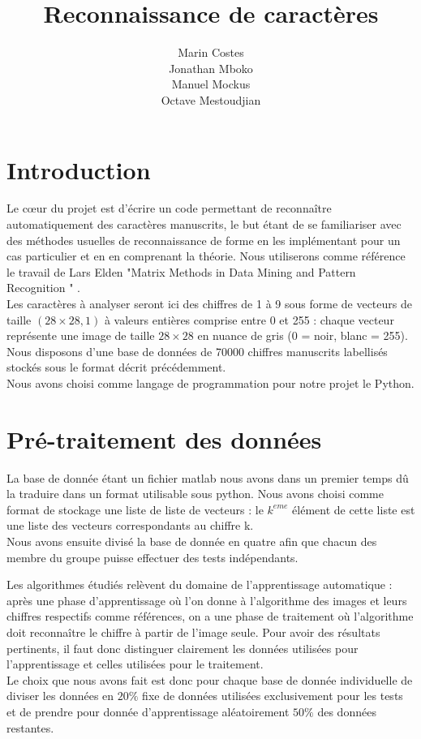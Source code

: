 \documentclass[a4paper,11pt,twoside]{report}
\author{Marin Costes\\Jonathan Mboko\\Manuel Mockus\\Octave Mestoudjian}
\title{Reconnaissance de caractères}
\begin{document}
 
\maketitle 

\tableofcontents
\chapter{Introduction}
Le cœur du projet est d'écrire un code permettant de reconnaître automatiquement des caractères manuscrits, le but étant de se familiariser avec des méthodes usuelles de reconnaissance de forme en les implémentant pour un cas particulier et en en comprenant la théorie. 
Nous utiliserons comme référence le travail de Lars Elden "Matrix Methods in Data Mining and Pattern Recognition  \cite{Elden:1}" \cite{Simard:2}. \\

Les caractères à analyser seront ici des chiffres de 1 à 9 sous forme de vecteurs de taille $(28\times28,1)$ à valeurs entières comprise entre 0 et 255 : chaque vecteur représente une image de taille $28\times28$ en nuance de gris (0 = noir, blanc = 255). Nous disposons d'une base de données de 70000 chiffres manuscrits labellisés stockés sous le format décrit précédemment.\\
 
Nous avons choisi comme langage de programmation pour notre projet le Python.

\chapter{Pré-traitement des données}
La base de donnée étant un fichier matlab nous avons dans un premier temps dû la traduire dans un format utilisable sous python. Nous avons choisi comme format de stockage une liste de liste de vecteurs : le $k^{eme}$ élément de cette liste est une liste des vecteurs correspondants au chiffre k.\\
Nous avons ensuite divisé la base de donnée en quatre afin que chacun des membre du groupe puisse effectuer des tests indépendants. 

Les algorithmes étudiés relèvent du domaine de l'apprentissage automatique : après une phase d'apprentissage où l'on donne à l'algorithme des images et leurs chiffres respectifs comme références, on a une phase de traitement où l'algorithme doit reconnaître le chiffre à partir de l'image seule. Pour avoir des résultats pertinents, il faut donc distinguer clairement les données utilisées pour l'apprentissage et celles utilisées pour le traitement.\\Le choix que nous avons fait est donc pour chaque base de donnée individuelle de diviser les données en $20\%$ fixe de données utilisées exclusivement pour les tests et de prendre pour donnée d'apprentissage aléatoirement $50\%$ des données restantes.
\end{document}
